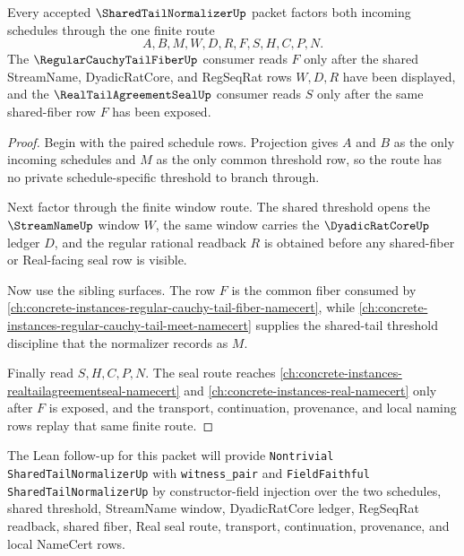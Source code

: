 \begin{theorem}
\label{thm:shared-tail-normalizer-common-threshold-factorization}
Every accepted $\SharedTailNormalizerUp$ packet factors both incoming schedules through the one finite route
$$
A,B,M,W,D,R,F,S,H,C,P,N.
$$
The $\RegularCauchyTailFiberUp$ consumer reads $F$ only after the shared StreamName, DyadicRatCore, and RegSeqRat rows $W,D,R$ have been displayed, and the $\RealTailAgreementSealUp$ consumer reads $S$ only after the same shared-fiber row $F$ has been exposed.
\end{theorem}
\begin{proof}
Begin with the paired schedule rows. Projection gives $A$ and $B$ as the only incoming schedules and $M$ as the only common threshold row, so the route has no private schedule-specific threshold to branch through.

Next factor through the finite window route. The shared threshold opens the $\StreamNameUp$ window $W$, the same window carries the $\DyadicRatCoreUp$ ledger $D$, and the regular rational readback $R$ is obtained before any shared-fiber or Real-facing seal row is visible.

Now use the sibling surfaces. The row $F$ is the common fiber consumed by \autoref{ch:concrete-instances-regular-cauchy-tail-fiber-namecert}, while \autoref{ch:concrete-instances-regular-cauchy-tail-meet-namecert} supplies the shared-tail threshold discipline that the normalizer records as $M$.

Finally read $S,H,C,P,N$. The seal route reaches \autoref{ch:concrete-instances-realtailagreementseal-namecert} and \autoref{ch:concrete-instances-real-namecert} only after $F$ is exposed, and the transport, continuation, provenance, and local naming rows replay that same finite route.
\end{proof}

The Lean follow-up for this packet will provide \texttt{Nontrivial SharedTailNormalizerUp} with \texttt{witness\_pair} and \texttt{FieldFaithful SharedTailNormalizerUp} by constructor-field injection over the two schedules, shared threshold, StreamName window, DyadicRatCore ledger, RegSeqRat readback, shared fiber, Real seal route, transport, continuation, provenance, and local NameCert rows.


